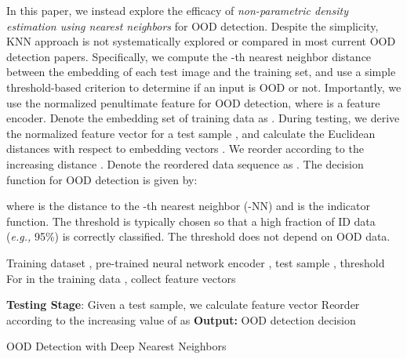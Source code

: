 \documentclass[nohyperref]{article}
\theoremstyle{plain}
\theoremstyle{definition}
\theoremstyle{remark}
\begin{document}
In this paper, we instead explore the efficacy of \emph{non-parametric density estimation using nearest neighbors} for OOD detection. Despite the simplicity, KNN approach is not systematically explored or compared in most
current OOD detection papers. Specifically, we compute the  -th nearest neighbor distance between the
embedding of each test image and the training set, and use
a simple threshold-based criterion to determine if an input
is OOD or not. Importantly, we use the normalized penultimate feature  for OOD detection, where  is a feature encoder. Denote the embedding set of training data as . During testing, we derive the normalized feature vector  for a test sample , and calculate the Euclidean distances  with respect to embedding vectors . We reorder  according to the increasing distance . 
Denote the reordered data sequence as . The decision function for OOD detection is given by: 
 
where  is the distance to the -th nearest neighbor (-NN) and  is the indicator function. The threshold  is typically chosen so that a high fraction of ID data (\emph{e.g.,} 95\%) is correctly classified. The threshold does not depend on OOD data.


\begin{algorithm}[t]
\begin{algorithmic}
    Training dataset , pre-trained neural network encoder , test sample , threshold \\
   
   \STATE For  in the training data ,  collect feature vectors 

   \STATE \textbf{Testing Stage}: 
        \STATE Given a test sample, we calculate feature vector 
\STATE Reorder  according to the increasing value of  as 
    \STATE \textbf{Output: } OOD detection decision 
\end{algorithmic}
\caption{OOD Detection with Deep Nearest Neighbors}
\label{alg}
\end{algorithm}
\end{document}
